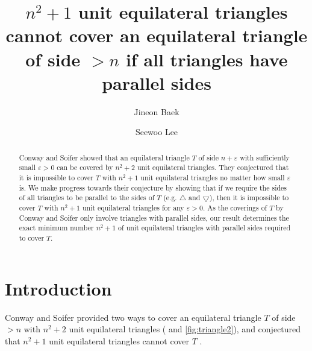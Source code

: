 \documentclass[a4paper]{amsart}
\theoremstyle{plain}
\theoremstyle{definition}
\begin{document}
\title[\(n^2 + 1\) unit vertical triangles cannot cover a triangle of side \(> n\)]{\(n^2 + 1\) unit equilateral triangles cannot cover an equilateral triangle of side \(> n\) if all triangles have parallel sides}

\author{Jineon Baek}
\address{University of Michigan - Ann Arbor}
\author{Seewoo Lee}
\address{University of California - Berkeley}

\begin{abstract}
Conway and Soifer showed that an equilateral triangle \(T\) of side \(n + \varepsilon\) with sufficiently small $\varepsilon > 0$ can be covered by \(n^2 + 2\) unit equilateral triangles.
They conjectured that it is impossible to cover $T$ with \(n^2 + 1\) unit equilateral triangles no matter how small $\varepsilon$ is.
We make progress towards their conjecture by showing that if we require the sides of all triangles to be parallel to the sides of \(T\) (e.g. $\bigtriangleup$ and $\bigtriangledown$), then it is impossible to cover \(T\) with \(n^2 + 1\) unit equilateral triangles for any $\varepsilon > 0$.
As the coverings of $T$ by Conway and Soifer only involve triangles with parallel sides,
our result determines the exact minimum number $n^2+1$ of unit equilateral triangles with parallel sides required to cover $T$.
\end{abstract}

\maketitle

\section{Introduction}

Conway and Soifer provided two ways to cover an equilateral triangle $T$ of side $> n$ with \(n^2 + 2\) unit equilateral triangles ( and \ref{fig:triangle2}), and conjectured that $n^2 + 1$ unit equilateral triangles cannot cover $T$ \cite{conway2004coverup, conway2005covering}.
\end{document}
